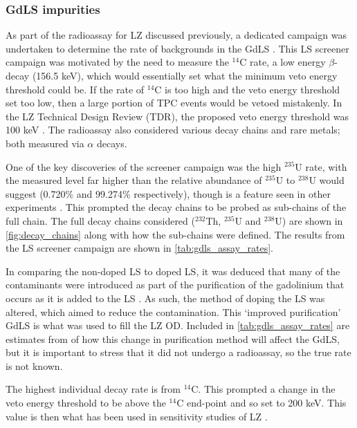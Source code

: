 \subsubsection{GdLS impurities}
\par
As part of the radioassay for LZ discussed previously, a dedicated campaign was undertaken to determine the rate of backgrounds in the GdLS \cite{scotthaselschwardt_thesis_ref}.
This LS screener campaign was motivated by the need to measure the $^{14}$C rate, a low energy $\beta$-decay (156.5 keV), which would essentially set what the minimum veto energy threshold could be.
If the rate of $^{14}$C is too high and the veto energy threshold set too low, then a large portion of TPC events would be vetoed mistakenly.
In the LZ Technical Design Review (TDR), the proposed veto energy threshold was 100 keV \cite{LZ_TechnicalDesignReview_ref}.
The radioassay also considered various decay chains and rare metals; both measured via $\alpha$ decays.
\par
One of the key discoveries of the screener campaign was the high ${}^{235}$U rate, with the measured level far higher than the relative abundance of ${}^{235}$U to ${}^{238}$U would suggest (0.720\% and 99.274\% respectively), though is a feature seen in other experiments \cite{javierperez_thesis_ref,superkamiokande_neutron_tagging_ref}.
This prompted the decay chains to be probed as sub-chains of the full chain.
The full decay chains considered ($^{232}$Th, $^{235}$U and $^{238}$U) are shown in \autoref{fig:decay_chains} along with how the sub-chains were defined.
The results from the LS screener campaign are shown in \autoref{tab:gdls_assay_rates}.
\par
In comparing the non-doped LS to doped LS, it was deduced that many of the contaminants were introduced as part of the purification of the gadolinium that occurs as it is added to the LS \cite{scotthaselschwardt_thesis_ref}.
As such, the method of doping the LS was altered, which aimed to reduce the contamination.
This `improved purification' GdLS is what was used to fill the LZ OD.
Included in \autoref{tab:gdls_assay_rates} are estimates from \cite{scotthaselschwardt_thesis_ref} of how this change in purification method will affect the GdLS, but it is important to stress that it did not undergo a radioassay, so the true rate is not known.
\par
The highest individual decay rate is from ${}^{14}$C.
This prompted a change in the veto energy threshold to be above the ${}^{14}$C end-point and so set to 200 keV.
This value is then what has been used in sensitivity studies of LZ \cite{LZ_projected_sensitivity_paper_ref}.

